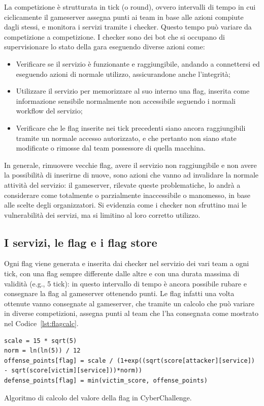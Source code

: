 La competizione è strutturata in tick (o round), ovvero intervalli di tempo in cui ciclicamente il gameserver assegna punti ai team in base alle azioni compiute dagli stessi, e monitora i servizi tramite i checker. Questo tempo può variare da competizione a competizione. I checker sono dei bot che si occupano di supervisionare lo stato della gara eseguendo diverse azioni come:
\begin{itemize}
    \setlength{\itemsep}{2pt}
    \setlength{\parskip}{2pt}
    \item Verificare se il servizio è funzionante e raggiungibile, andando a connettersi ed eseguendo azioni di normale utilizzo, assicurandone anche l'integrità;
    \item Utilizzare il servizio per memorizzare al suo interno una flag, inserita come informazione sensibile normalmente non accessibile seguendo i normali workflow del servizio;
    \item Verificare che le flag inserite nei tick precedenti siano ancora raggiungibili tramite un normale accesso autorizzato, e che pertanto non siano state modificate o rimosse dal team possessore di quella macchina.
\end{itemize}

In generale, rimuovere vecchie flag, avere il servizio non raggiungibile e non avere la possibilità di inserirne di nuove, sono azioni che vanno ad invalidare la normale attività del servizio: il gameserver, rilevate queste problematiche, lo andrà a considerare come totalmente o parzialmente inaccessibile o manomesso, in base alle scelte degli organizzatori.
Si evidenzia come i checker non sfruttino mai le vulnerabilità dei servizi, ma si limitino al loro corretto utilizzo.

\subsection{I servizi, le flag e i flag store}

Ogni flag viene generata e inserita dai checker nel servizio dei vari team a ogni tick, con una flag sempre differente dalle altre e con una durata massima di validità (e.g., 5 tick): in questo intervallo di tempo è ancora possibile rubare e consegnare la flag al gameserver ottenendo punti.
Le flag infatti una volta ottenute vanno consegnate al gameserver, che tramite un calcolo che può variare in diverse competizioni, assegna punti al team che l'ha consegnata come mostrato nel Codice~\ref{lst:flagcalc}.

\begin{listing}[H]
\begin{verbatim}
scale = 15 * sqrt(5)
norm = ln(ln(5)) / 12
offense_points[flag] = scale / (1+exp((sqrt(score[attacker][service]) - sqrt(score[victim][service]))*norm))
defense_points[flag] = min(victim_score, offense_points)
\end{verbatim}
\vspace{-1em}
\caption{Algoritmo di calcolo del valore della flag in CyberChallenge.}\label{lst:flagcalc}
\end{listing}

